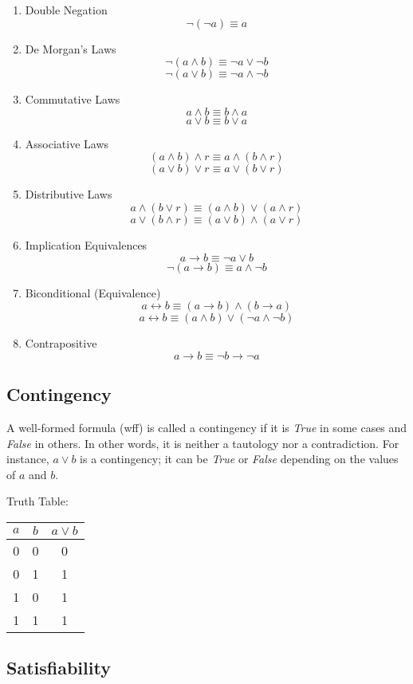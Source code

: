 \documentclass[12pt,a4paper,openany]{article}
\begin{document}
\begin{enumerate}
\item
  Double Negation
  \[\neg(\neg a) \equiv a\]
\item
  De Morgan's Laws
  \[\neg(a \land b) \equiv \neg a \lor \neg b\]
  \[\neg(a \lor b) \equiv \neg a \land \neg b\]
\item
  Commutative Laws
  \[a \land b \equiv b \land a\]
  \[a \lor b \equiv b \lor a\]
\item
  Associative Laws
  \[(a \land b) \land r \equiv a \land (b \land r)\]
  \[(a \lor b) \lor r \equiv a \lor (b \lor r)\]
\item
  Distributive Laws
  \[a \land (b \lor r) \equiv (a \land b) \lor (a \land r)\]
  \[a \lor (b \land r) \equiv (a \lor b) \land (a \lor r)\]
\item
  Implication Equivalences
  \[a \to b \equiv \neg a \lor b\]
  \[\neg(a \to b) \equiv a \land \neg b\]
\item
  Biconditional (Equivalence)
  \[a \leftrightarrow b \equiv (a \to b) \land (b \to a)\]
  \[a \leftrightarrow b \equiv (a \land b) \lor (\neg a \land \neg b)\]
\item
  Contrapositive
  \[a \to b \equiv \neg b \to \neg a\]
\end{enumerate}

\subsection{Contingency}\label{contingency}

A well-formed formula (wff) is called a contingency if it is \emph{True}
in some cases and \emph{False} in others. In other words, it is neither
a tautology nor a contradiction. For instance, \(a \lor b\) is a
contingency; it can be \emph{True} or \emph{False} depending on the
values of \(a\) and \(b\).

Truth Table:

\begin{center}
\begin{tabular}{|c|c|c|}
\hline
\(a\) & \(b\) & \(a \lor b\) \\
\hline
0 & 0 & 0 \\
0 & 1 & 1 \\
1 & 0 & 1 \\
1 & 1 & 1 \\
\hline
\end{tabular}
\end{center}

\subsection{Satisfiability}\label{satisfiability}
\end{document}
